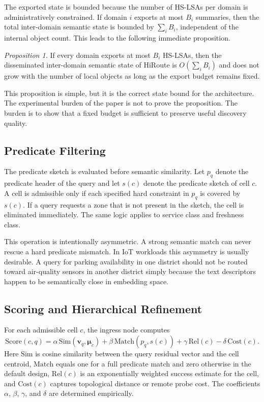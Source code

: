 \documentclass[journal]{IEEEtran}
\newcommand{\sysname}{HiRoute}
\newcommand{\hslsa}{HS-LSA}
\newcommand{\vect}[1]{\boldsymbol{#1}}
\newcommand{\score}{\mathrm{Score}}
\newcommand{\simf}{\mathrm{Sim}}
\newcommand{\matchf}{\mathrm{Match}}
\newcommand{\relf}{\mathrm{Rel}}
\newcommand{\costf}{\mathrm{Cost}}
\begin{document}
The exported state is bounded because the number of \hslsa{}s per domain is administratively constrained. If domain $i$ exports at most $B_i$ summaries, then the total inter-domain semantic state is bounded by $\sum_i B_i$, independent of the internal object count. This leads to the following immediate proposition.

\textit{Proposition 1.} If every domain exports at most $B_i$ \hslsa{}s, then the disseminated inter-domain semantic state of \sysname{} is $O\!\left(\sum_i B_i\right)$ and does not grow with the number of local objects as long as the export budget remains fixed.

This proposition is simple, but it is the correct state bound for the architecture. The experimental burden of the paper is not to prove the proposition. The burden is to show that a fixed budget is sufficient to preserve useful discovery quality.

\subsection{Predicate Filtering}

The predicate sketch is evaluated before semantic similarity. Let $p_q$ denote the predicate header of the query and let $s(c)$ denote the predicate sketch of cell $c$. A cell is admissible only if each specified hard constraint in $p_q$ is covered by $s(c)$. If a query requests a zone that is not present in the sketch, the cell is eliminated immediately. The same logic applies to service class and freshness class.

This operation is intentionally asymmetric. A strong semantic match can never rescue a hard predicate mismatch. In IoT workloads this asymmetry is usually desirable. A query for parking availability in one district should not be routed toward air-quality sensors in another district simply because the text descriptors happen to be semantically close in embedding space.

\subsection{Scoring and Hierarchical Refinement}

For each admissible cell $c$, the ingress node computes
\begin{equation}
\label{eq:score}
\score(c,q)=\alpha\,\simf(\vect{v}_q,\vect{\mu}_c)+\beta\,\matchf(p_q,s(c))+\gamma\,\relf(c)-\delta\,\costf(c).
\end{equation}
Here $\simf$ is cosine similarity between the query residual vector and the cell centroid, $\matchf$ equals one for a full predicate match and zero otherwise in the default design, $\relf(c)$ is an exponentially weighted success estimate for the cell, and $\costf(c)$ captures topological distance or remote probe cost. The coefficients $\alpha$, $\beta$, $\gamma$, and $\delta$ are determined empirically.
\end{document}
